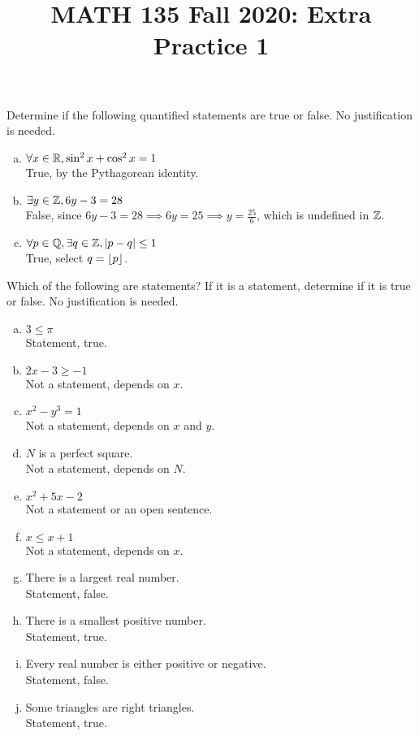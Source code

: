 \documentclass{agony}
\title{MATH 135 Fall 2020: Extra Practice 1}
\begin{document}
\thispagestyle{firstpage}

\textbf{\thetitle}


\question Determine if the following quantified statements are true or false.
No justification is needed.
\begin{enumerate}[(a)]
  \item $\forall x\in\mathbb{R}, \sin^2x+\cos^2x=1$ \\
        True, by the Pythagorean identity.
  \item $\exists y\in\mathbb{Z}, 6y-3=28$ \\
        False, since $6y-3=28 \implies 6y=25 \implies y=\frac{25}{6}$, which is undefined in $\mathbb{Z}$.
  \item $\forall p\in\mathbb{Q}, \exists q\in\mathbb{Z}, |p-q| \leq 1$ \\
        True, select $q = \lfloor p\rfloor$.
\end{enumerate}



\question Which of the following are statements?
If it is a statement, determine if it is true or false.
No justification is needed.
\begin{enumerate}[(a)]
  \item $3 \leq \pi$ \\
        Statement, true.
  \item $2x-3 \geq -1$ \\
        Not a statement, depends on $x$.
  \item $x^2-y^3 = 1$ \\
        Not a statement, depends on $x$ and $y$.
  \item $N$ is a perfect square. \\
        Not a statement, depends on $N$.
  \item $x^2+5x-2$ \\
        Not a statement or an open sentence.
  \item $x \leq x+1$ \\
        Not a statement, depends on $x$.
  \item There is a largest real number. \\
        Statement, false.
  \item There is a smallest positive number. \\
        Statement, true.
  \item Every real number is either positive or negative. \\
        Statement, false.
  \item Some triangles are right triangles. \\
        Statement, true.
\end{enumerate}
\end{document}

